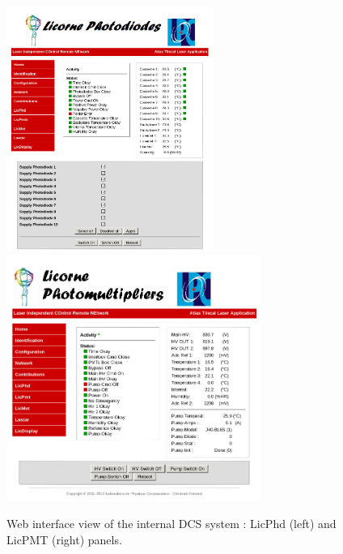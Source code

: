 

\begin{figure}[htbp]
\centering
\includegraphics[height=8cm]{figures/licorne_web1.png}
\includegraphics[height=8cm]{figures/licorne_web2.png}
\caption{Web interface view of the internal DCS system : LicPhd (left) and LicPMT (right) panels.}\label{fig:licorne_weba}
\end{figure}

